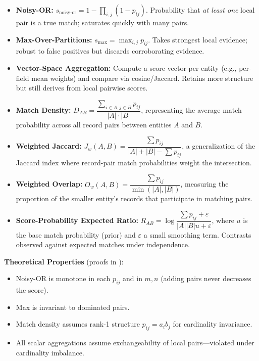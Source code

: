 \begin{itemize}
	\item \textbf{Noisy-OR:} $s_{\text{noisy-or}} = 1 - \prod_{i,j} (1 - p_{ij})$. Probability that \textit{at least one} local pair is a true match; saturates quickly with many pairs.

	\item \textbf{Max-Over-Partitions:} $s_{\text{max}} = \max_{i,j} p_{ij}$. Takes strongest local evidence; robust to false positives but discards corroborating evidence.

	\item \textbf{Vector-Space Aggregation:} Compute a score vector per entity (e.g., per-field mean weights) and compare via cosine/Jaccard. Retains more structure but still derives from local pairwise scores.

	\item \textbf{Match Density:} $D_{AB} = \dfrac{\sum_{i\in A, j\in B} p_{ij}}{|A| \cdot |B|}$, representing the average match probability across all record pairs between entities $A$ and $B$.

	\item \textbf{Weighted Jaccard:} $J_w(A,B) = \dfrac{\sum p_{ij}}{|A| + |B| - \sum p_{ij}}$, a generalization of the Jaccard index where record-pair match probabilities weight the intersection.

	\item \textbf{Weighted Overlap:} $O_w(A,B) = \dfrac{\sum p_{ij}}{\min(|A|,|B|)}$, measuring the proportion of the smaller entity's records that participate in matching pairs.

	\item \textbf{Score-Probability Expected Ratio:} $R_{AB} = \log \dfrac{\sum p_{ij} + \varepsilon}{|A| |B| u + \varepsilon}$, where $u$ is the base match probability (prior) and $\varepsilon$ a small smoothing term. Contrasts observed against expected matches under independence.
\end{itemize}

\noindent\textbf{Theoretical Properties} (proofs in ):
\begin{itemize}
	\item Noisy-OR is monotone in each $p_{ij}$ and in $m,n$ (adding pairs never decreases the score).
	\item Max is invariant to dominated pairs.
	\item Match density assumes rank-1 structure $p_{ij} = a_i b_j$ for cardinality invariance.
	\item All scalar aggregations assume exchangeability of local pairs—violated under cardinality imbalance.
\end{itemize}


